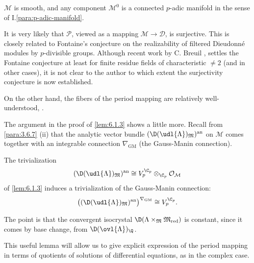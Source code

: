 \begin{cor}\label{cor:6.2.2} $\mathcal{M}$ is smooth, and any component
 $\mathcal{M}^0$ is a connected $p$-adic manifold in the sense of
 I.\ref{para:p-adic-manifold}.
\end{cor}
\begin{para}\label{para:6.2.3}
 It is very likely that $\mathcal{P}$, viewed as a mapping
 $\mathcal{M}\rightarrow \mathcal{D}$, is surjective.  This is closely
 related to Fontaine's conjecture on the realizability of filtered
 Dieudonn\'e modules by $p$-divisible groups. Although recent work by
 C. Breuil \cite{breuil99:_repres}, \cite{breuil00:_group} settles the
 Fontaine conjecture at least for 
 finite residue fields of characteristic $\neq 2$ (and in other cases),
 it is not clear to the author to which extent the surjectivity
 conjecture is now established.


 On the other hand, the fibers of the period mapping are relatively
 well-understood, \cf \cite[5.37]{psfpg}. 
\end{para}

\begin{para}\label{para:6.2.4}
 The argument in the proof of \ref{lem:6.1.3} shows a little more. Recall from
 \ref{para:3.6.7} (ii) that the analytic vector bundle
 $(\D(\udl{\Lambda})_{\mathfrak{M}})^{\mathrm{an}}$ on $\mathcal{M}$ comes
 together with an integrable connection $\nabla_{\mathrm{GM}}$ (the Gauss-Manin
 connection).
\end{para}

 \begin{lem}\label{lem:6.2.5} The trivialization 
  \begin{equation*}
   (\D(\udl{\Lambda})_{\mathfrak{M}})^{\mathrm{an}}\cong
   V_p^{\C_p}\otimes_{\C_p}\mathcal{O}_\mathcal{M}
  \end{equation*}
  of \ref{lem:6.1.3} induces a trivialization of the Gauss-Manin connection:  
  \begin{equation*}
   \bigl(
    (\D(\udl{\Lambda})_{\mathfrak{M}})^{\mathrm{an}}
    \bigr)^{\nabla_{\mathrm{GM}}} 
    \cong V_p^{\C_p}.
  \end{equation*}

  The point is that the convergent isocrystal
  $\D(\Lambda\times_{\mathfrak{M}}{\mathfrak{M}}_{\mathrm{red}})$ is constant, 
  since it comes by base change, from $\D(\ovl{\Lambda})_\Q$.
 \end{lem}
 This useful lemma will allow us to give explicit expression of the
 period mapping in terms of quotients of solutions of differential
 equations, as in the complex case. 


